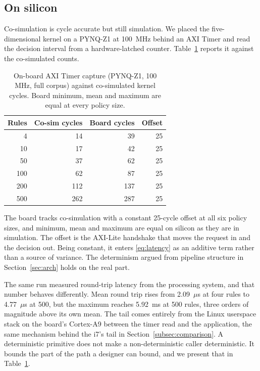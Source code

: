 \documentclass[conference]{IEEEtran}
\newcommand{\new}[1]{#1}
\newcommand{\newcolor}{}
\begin{document}
\subsection{\new{On silicon}}
\label{subsec:onsilicon}

\new{Co-simulation is cycle accurate but still simulation. We placed the five-dimensional kernel on a PYNQ-Z1 at 100~MHz behind an AXI Timer and read the decision interval from a hardware-latched counter. Table~\ref{tab:board} reports it against the co-simulated counts.}

\begin{table}[t]
\caption{\new{On-board AXI Timer capture (PYNQ-Z1, 100 MHz, full corpus) against co-simulated kernel cycles. Board minimum, mean and maximum are equal at every policy size.}}
\label{tab:board}
\centering
\newcolor
\begin{tabular}{rrrr}
\toprule
Rules & Co-sim cycles & Board cycles & Offset \\
\midrule
4 & 14 & 39 & 25 \\
10 & 17 & 42 & 25 \\
50 & 37 & 62 & 25 \\
100 & 62 & 87 & 25 \\
200 & 112 & 137 & 25 \\
500 & 262 & 287 & 25 \\
\bottomrule
\end{tabular}
\end{table}

\new{The board tracks co-simulation with a constant 25-cycle offset at all six policy sizes, and minimum, mean and maximum are equal on silicon as they are in simulation. The offset is the AXI-Lite handshake that moves the request in and the decision out. Being constant, it enters \eqref{eq:latency} as an additive term rather than a source of variance. The determinism argued from pipeline structure in Section~\ref{sec:arch} holds on the real part.}

\new{The same run measured round-trip latency from the processing system, and that number behaves differently. Mean round trip rises from 2.09~$\mu$s at four rules to 4.77~$\mu$s at 500, but the maximum reaches 5.92~ms at 500 rules, three orders of magnitude above its own mean. The tail comes entirely from the Linux userspace stack on the board's Cortex-A9 between the timer read and the application, the same mechanism behind the i7's tail in Section~\ref{subsec:comparison}. A deterministic primitive does not make a non-deterministic caller deterministic. It bounds the part of the path a designer can bound, and we present that in Table~\ref{tab:board}.}
\end{document}
